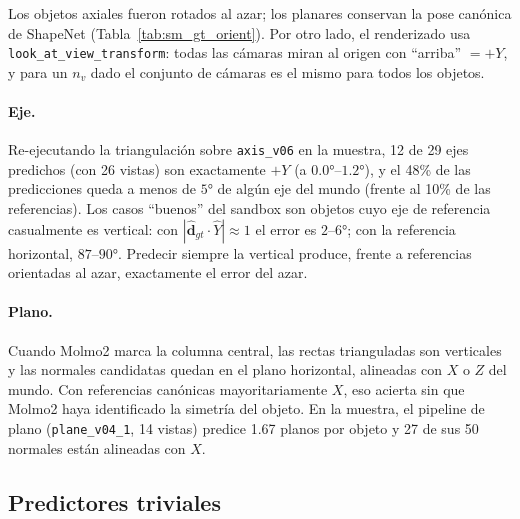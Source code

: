 Los objetos axiales fueron rotados al azar; los planares conservan la pose canónica
de ShapeNet (Tabla~\ref{tab:sm_gt_orient}). Por otro lado, el renderizado usa
\texttt{look\_at\_view\_transform}: todas las cámaras miran al origen con ``arriba''
$=+Y$, y para un $n_v$ dado el conjunto de cámaras es el mismo para todos los objetos.

\paragraph{Eje.} Re-ejecutando la triangulación sobre \texttt{axis\_v06} en la
muestra, 12 de 29 ejes predichos (con 26 vistas) son exactamente $+Y$ (a
$0.0°$--$1.2°$), y el 48\% de las predicciones queda a menos de $5°$ de algún eje del
mundo (frente al 10\% de las referencias). Los casos ``buenos'' del sandbox son
objetos cuyo eje de referencia casualmente es vertical: con $|\hat{\mathbf{d}}_{gt}\cdot\hat{Y}|\approx 1$
el error es $2$--$6°$; con la referencia horizontal, $87$--$90°$. Predecir siempre la
vertical produce, frente a referencias orientadas al azar, exactamente el error del
azar.

\paragraph{Plano.} Cuando Molmo2 marca la columna central, las rectas trianguladas
son verticales y las normales candidatas quedan en el plano horizontal, alineadas
con $X$ o $Z$ del mundo. Con referencias canónicas mayoritariamente $X$, eso acierta
sin que Molmo2 haya identificado la simetría del objeto. En la muestra, el
pipeline de plano (\texttt{plane\_v04\_1}, 14 vistas) predice 1.67 planos por
objeto y 27 de sus 50 normales están alineadas con $X$.

\subsection{Predictores triviales}
\label{sec:sm_triviales}

